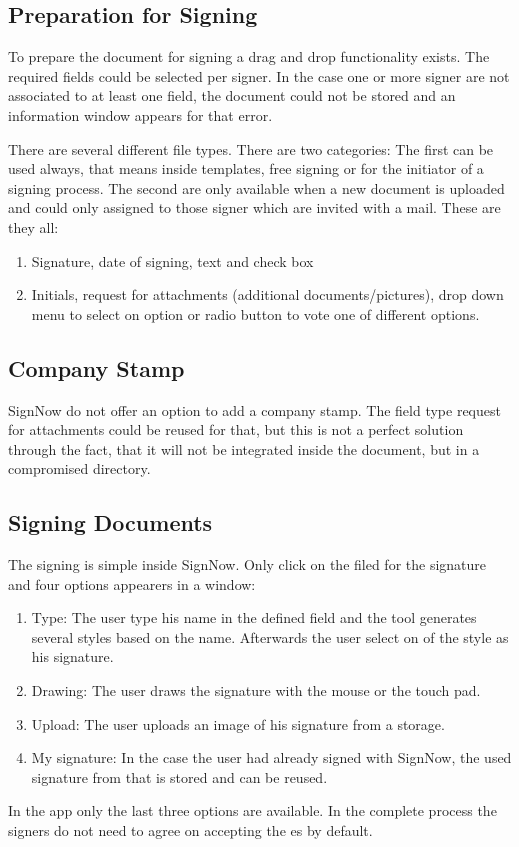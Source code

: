 \subsection{Preparation for Signing}
To prepare the document for signing a drag and drop functionality exists. The required fields could be selected per signer. In the case one or more signer are not associated to at least one field, the document could not be stored and an information window appears for that error.

There are several different file types. There are two categories: The first can be used always, that means inside templates, free signing or for the initiator of a signing process. The second are only available when a new document is uploaded and could only assigned to those signer which are invited with a mail. These are they all:
\begin{enumerate}
	\item Signature, date of signing, text and check box
	\item Initials, request for attachments (additional documents/pictures), drop down menu to select on option or radio button to vote one of different options.
\end{enumerate}

\subsection{Company Stamp}
SignNow do not offer an option to add a company stamp. The field type request for attachments could be reused for that, but this is not a perfect solution through the fact, that it will not be integrated inside the document, but in a compromised directory.

\subsection{Signing Documents}
The signing is simple inside SignNow. Only click on the filed for the signature and four options appearers in a window:
\begin{enumerate}
	\item Type: The user type his name in the defined field and the tool generates several styles based on the name. Afterwards the user select on of the style as his signature.
	\item Drawing: The user draws the signature with the mouse or the touch pad.
	\item Upload: The user uploads an image of his signature from a storage.
	\item My signature: In the case the user had already signed with SignNow, the used signature from that is stored and can be reused.
\end{enumerate}
In the \gls{app} only the last three options are available. In the complete process the signers do not need to agree on accepting the \gls{es} by default.

